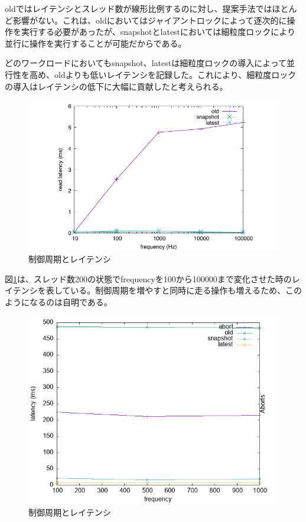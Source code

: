 \documentclass[a4paper]{jreport}	%
\begin{document}
oldではレイテンシとスレッド数が線形比例するのに対し、提案手法ではほとんど影響がない。これは、oldにおいてはジャイアントロックによって逐次的に操作を実行する必要があったが、snapshotとlatestにおいては細粒度ロックにより並行に操作を実行することが可能だからである。

どのワークロードにおいてもsnapshot、latestは細粒度ロックの導入によって並行性を高め、oldよりも低いレイテンシを記録した。これにより、細粒度ロックの導入はレイテンシの低下に大幅に貢献したと考えられる。


\begin{figure}[h] 
\centering
\includegraphics[width=15cm]{latency-frequency}
\caption{制御周期とレイテンシ}
\label{fig:latency-frequency}
\end{figure}

図\ref{fig:latency-frequency}は、スレッド数200の状態でfrequencyを100から100000まで変化させた時のレイテンシを表している。制御周期を増やすと同時に走る操作も増えるため、このようになるのは自明である。


\begin{figure}[h] 
\centering
\includegraphics[width=15cm]{frequency-real}
\caption{制御周期とレイテンシ}
\label{fig:frequency-real}
\end{figure}
\end{document}
